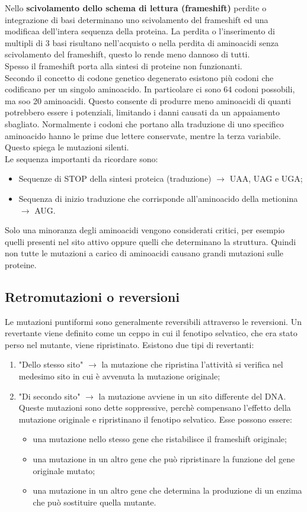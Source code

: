 Nello \textbf{scivolamento dello schema di lettura (frameshift)} perdite o integrazione di basi determinano uno scivolamento del frameshift ed una modificaa dell'intera sequenza della proteina. La perdita o l'inserimento di multipli di 3 basi risultano nell'acquisto o nella perdita di aminoacidi senza scivolamento del frameshift, questo lo rende meno dannoso di tutti. 
\\Spesso il frameshift porta alla sintesi di proteine non funzionanti. 
\\Secondo il concetto di codone genetico degenerato esistono più codoni che codificano per un singolo aminoacido. In particolare ci sono 64 codoni possobili, ma soo 20 aminoacidi. Questo consente di produrre meno aminoacidi di quanti potrebbero essere i potenziali, limitando i danni causati da un appaiamento sbagliato. Normalmente i codoni che portano alla traduzione di uno specifico aminoacido hanno le prime due lettere conservate, mentre la terza variabile. Questo spiega le mutazioni silenti.
\\Le sequenza importanti da ricordare sono:
\begin{itemize}
    \item Sequenze di STOP della sintesi proteica (traduzione) $\xrightarrow{}$ UAA, UAG e UGA; 
    \item Sequenza di inizio traduzione che corrisponde all'aminoacido della metionina $\xrightarrow{}$ AUG.
\end{itemize}
Solo una minoranza degli aminoacidi vengono considerati critici, per esempio quelli presenti nel sito attivo oppure quelli che determinano la struttura. Quindi non tutte le mutazioni a carico di aminoacidi causano grandi mutazioni sulle proteine. 
\subsection{Retromutazioni o reversioni}
Le mutazioni puntiformi sono generalmente reversibili attraverso le reversioni. Un revertante viene definito come un ceppo in cui il fenotipo selvatico, che era stato perso nel mutante, viene ripristinato. Esistono due tipi di revertanti:
\begin{enumerate}
    \item "Dello stesso sito" $\xrightarrow{}$ la mutazione che ripristina l'attività si verifica nel medesimo sito in cui è avvenuta la mutazione originale; 
    \item "Di secondo sito" $\xrightarrow{}$ la mutazione avviene in un sito differente del DNA. Queste mutazioni sono dette soppressive, perchè compensano l'effetto della mutazione originale e ripristinano il fenotipo selvatico. Esse possono essere: 
    \begin{itemize}
        \item una mutazione nello stesso gene che ristabilisce il frameshift originale;
        \item una mutazione in un altro gene che può ripristinare la funzione del gene originale mutato; 
        \item una mutazione in un altro gene che determina la produzione di un enzima che può sostituire quella mutante. 
    \end{itemize}
\end{enumerate}
